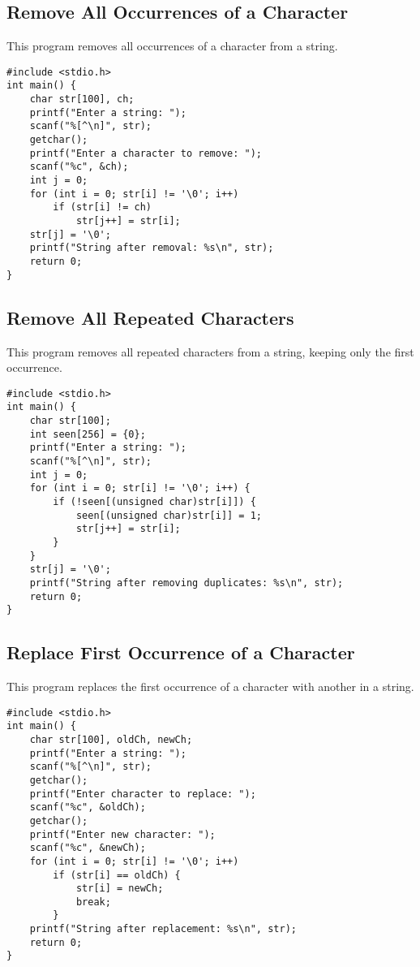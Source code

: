 \documentclass[a4paper,12pt]{article}
\begin{document}
\subsection{Remove All Occurrences of a Character}
This program removes all occurrences of a character from a string.
\begin{lstlisting}[caption={Remove All Occurrences of a Character}]
#include <stdio.h>
int main() {
    char str[100], ch;
    printf("Enter a string: ");
    scanf("%[^\n]", str);
    getchar();
    printf("Enter a character to remove: ");
    scanf("%c", &ch);
    int j = 0;
    for (int i = 0; str[i] != '\0'; i++)
        if (str[i] != ch)
            str[j++] = str[i];
    str[j] = '\0';
    printf("String after removal: %s\n", str);
    return 0;
}
\end{lstlisting}
\clearpage

\subsection{Remove All Repeated Characters}
This program removes all repeated characters from a string, keeping only the first occurrence.
\begin{lstlisting}[caption={Remove All Repeated Characters}]
#include <stdio.h>
int main() {
    char str[100];
    int seen[256] = {0};
    printf("Enter a string: ");
    scanf("%[^\n]", str);
    int j = 0;
    for (int i = 0; str[i] != '\0'; i++) {
        if (!seen[(unsigned char)str[i]]) {
            seen[(unsigned char)str[i]] = 1;
            str[j++] = str[i];
        }
    }
    str[j] = '\0';
    printf("String after removing duplicates: %s\n", str);
    return 0;
}
\end{lstlisting}
\clearpage

\subsection{Replace First Occurrence of a Character}
This program replaces the first occurrence of a character with another in a string.
\begin{lstlisting}[caption={Replace First Occurrence of a Character}]
#include <stdio.h>
int main() {
    char str[100], oldCh, newCh;
    printf("Enter a string: ");
    scanf("%[^\n]", str);
    getchar();
    printf("Enter character to replace: ");
    scanf("%c", &oldCh);
    getchar();
    printf("Enter new character: ");
    scanf("%c", &newCh);
    for (int i = 0; str[i] != '\0'; i++)
        if (str[i] == oldCh) {
            str[i] = newCh;
            break;
        }
    printf("String after replacement: %s\n", str);
    return 0;
}
\end{lstlisting}
\clearpage
\end{document}
